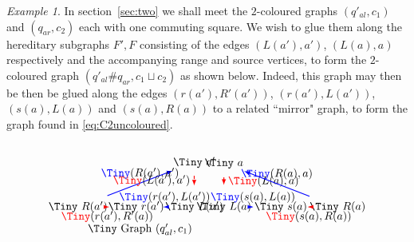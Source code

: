 \documentclass[12pt]{amsart}
\theoremstyle{definition}
\theoremstyle{remark}
\newtheorem{example}[thm]{Example}
\numberwithin{equation}{section}
\begin{document}
\begin{example}
In section~\ref{sec:two} we shall meet the $2$-coloured graphs $(q'_{al},c_1)$ and $(q_{ar},c_2)$ each with one commuting square. We wish to glue them along the hereditary subgraphs $F',F$ consisting of the edges $(L(a'),a')$, $(L(a),a)$ respectively and the accompanying range and source vertices, to form the $2$-coloured graph $(q'_{al} \# q_{ar} , c_1 \sqcup c_2 )$ as shown below. Indeed, this graph may then be then be glued along the edges $(r(a'),R'(a'))$, $(r(a'),L(a'))$, $(s(a),L(a))$ and $(s(a),R(a))$ to a related ``mirror" graph, to form the graph found in \eqref{eq:C2uncoloured}.
\begin{equation} \label{eq:gluex}
\begin{array}{c}
\begin{tikzpicture}[->=stealth,xscale=0.68,yscale=0.78]

\begin{scope}[scale=0.9,xshift=-10.6cm]

\node[inner sep=1pt,circle] (p0) at (-3.2,0) {\Tiny $r(a')$};
\node[inner sep=1pt,circle] (f0) at (-0.2,0) {\Tiny $L(a')$};
\node[inner sep=1pt,circle] (lf1) at (-6.2,0) {\Tiny $R(a')$};

\node[inner sep=1pt,circle] (a0) at (-0.2,2) {\Tiny $a'$};
\draw[thick,-latex,blue] (p0) -- (f0) node[pos=0.5,above] {\Tiny\color{black}$(r(a'),L(a'))$};
\draw[thick,-latex,red,dashed] (p0) -- (lf1) node[pos=0.3,below] {\Tiny\color{black}$(r(a'),R'(a))$};

\draw[thick,-latex,blue] (lf1) -- (a0) node[pos=0.5,above] {\Tiny\color{black}$(R(a'),a')$};
\draw[thick,-latex,red,dashed] (f0) -- (a0) node[pos=0.5,left] {\Tiny\color{black}$(L(a'),a')$};

\node at (-3,-1) {\Tiny Graph $(q'_{al},c_1)$};
\end{scope}

\begin{scope}[scale=0.88,xshift=-9.48cm]

\node[inner sep=1pt,circle] (p1) at (3,0) {\Tiny $s(a)$};
\node[inner sep=1pt,circle] (f0) at (0,0) {\Tiny $L(a)$};
\node[inner sep=1pt,circle] (rf1) at (6,0) {\Tiny $R(a)$};

\node[inner sep=1pt,circle] (a0) at (0,2) {\Tiny $a$};
\draw[thick,-latex,blue] (p1) -- (f0) node[pos=0.5,above] {\Tiny\color{black}$(s(a),L(a))$};
\draw[thick,-latex,red,dashed] (p1) -- (rf1) node[pos=0.3,below] {\Tiny\color{black}$(s(a),R(a))$};
\draw[thick,-latex,red,dashed] (f0) -- (a0) node[pos=0.5,right] {\Tiny\color{black}$(L(a),a)$};
\draw[thick,-latex,blue] (rf1) -- (a0) node[pos=0.5,above] {\Tiny\color{black}$(R(a),a)$};


\end{scope}
\end{tikzpicture}
\end{array}
\end{equation}
\end{example}
\end{document}
